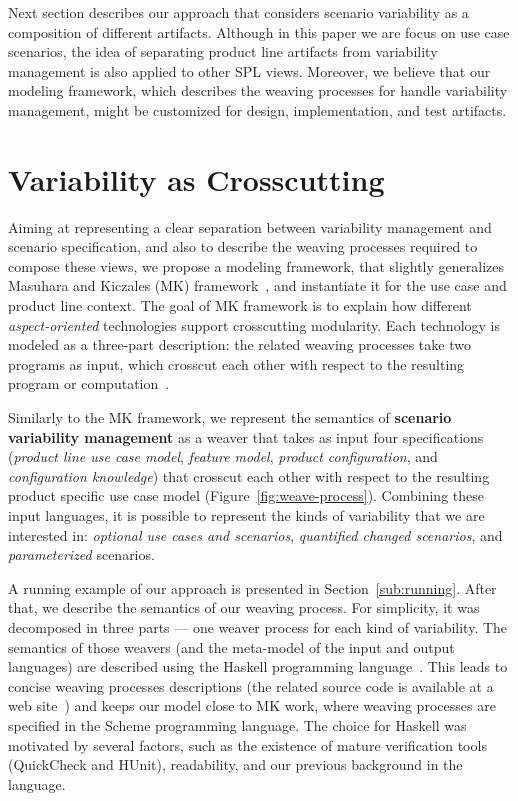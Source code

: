 \documentclass{acm_proc_article-sp}
\begin{document}
Next section describes our approach that considers scenario variability as a composition of different artifacts. Although in this paper we are focus on use case scenarios, the idea of separating product line artifacts from variability management is also applied to other SPL views. Moreover, we believe that our modeling framework, which describes the weaving processes for handle variability management, might be customized for design, implementation, and test artifacts. 


\section{Variability as Crosscutting}
\label{sec:models}

Aiming at representing a clear separation between variability management and scenario specification, and also 
to describe the weaving processes required to compose these views, we propose a modeling framework, that slightly generalizes Masuhara and Kiczales (MK) framework~\cite{kiczales-ecoop-2003}, and instantiate it for the use case and product line context. The goal of MK framework is to
explain how different \emph{aspect-oriented} technologies support crosscutting modularity. Each technology is modeled 
as a three-part description: the related weaving processes take two programs as input, which crosscut each other with respect 
to the resulting program or computation~\cite{kiczales-ecoop-2003}. 

Similarly to the MK framework, we represent the semantics of \textbf{scenario variability management} as a weaver that takes as input four specifications
(\emph{product line use case model}, \emph{feature model}, \emph{product configuration}, and \emph{configuration knowledge}) that 
crosscut each other with respect to the resulting product specific use case model (Figure~\ref{fig:weave-process}). Combining these input languages, 
it is possible to represent the kinds of variability that we are interested in: \emph{optional use cases and scenarios}, \emph{quantified changed scenarios}, 
and \emph{parameterized} scenarios. 

A running example of our approach is presented in Section~\ref{sub:running}. After that, we describe the semantics of our weaving process. For 
simplicity, it was decomposed in three parts --- one weaver process for each kind of variability.  The semantics of those 
weavers (and the meta-model of the input and output languages) are described using the Haskell programming language~\cite{haskell-report}. 
This leads to concise weaving processes descriptions (the related source code is available at a web site~\cite{spg-url}) and keeps our model close to MK work, where weaving processes are specified in the Scheme programming language. The choice for Haskell was motivated by several factors, such as the existence of mature verification tools (QuickCheck and HUnit), readability, and our previous background in the language. 
 
\end{document}
